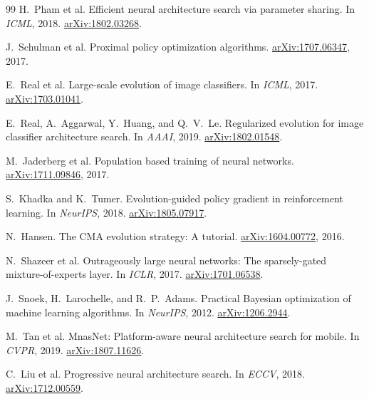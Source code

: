 \documentclass[10pt,twocolumn,letterpaper]{article}
\theoremstyle{remark}
\begin{document}
{\begin{thebibliography}{99}
H.~Pham et al.
\newblock Efficient neural architecture search via parameter sharing.
\newblock In \emph{ICML}, 2018.
\newblock \href{https://arxiv.org/abs/1802.03268}{arXiv:1802.03268}.

J.~Schulman et al.
\newblock Proximal policy optimization algorithms.
\newblock \href{https://arxiv.org/abs/1707.06347}{arXiv:1707.06347}, 2017.

E.~Real et al.
\newblock Large-scale evolution of image classifiers.
\newblock In \emph{ICML}, 2017.
\newblock \href{https://arxiv.org/abs/1703.01041}{arXiv:1703.01041}.

E.~Real, A.~Aggarwal, Y.~Huang, and Q.~V.~Le.
\newblock Regularized evolution for image classifier architecture search.
\newblock In \emph{AAAI}, 2019.
\newblock \href{https://arxiv.org/abs/1802.01548}{arXiv:1802.01548}.

M.~Jaderberg et al.
\newblock Population based training of neural networks.
\newblock \href{https://arxiv.org/abs/1711.09846}{arXiv:1711.09846}, 2017.

S.~Khadka and K.~Tumer.
\newblock Evolution-guided policy gradient in reinforcement learning.
\newblock In \emph{NeurIPS}, 2018.
\newblock \href{https://arxiv.org/abs/1805.07917}{arXiv:1805.07917}.

N.~Hansen.
\newblock The CMA evolution strategy: A tutorial.
\newblock \href{https://arxiv.org/abs/1604.00772}{arXiv:1604.00772}, 2016.

N.~Shazeer et al.
\newblock Outrageously large neural networks: The sparsely-gated mixture-of-experts layer.
\newblock In \emph{ICLR}, 2017.
\newblock \href{https://arxiv.org/abs/1701.06538}{arXiv:1701.06538}.

J.~Snoek, H.~Larochelle, and R.~P.~Adams.
\newblock Practical Bayesian optimization of machine learning algorithms.
\newblock In \emph{NeurIPS}, 2012.
\newblock \href{https://arxiv.org/abs/1206.2944}{arXiv:1206.2944}.

M.~Tan et al.
\newblock MnasNet: Platform-aware neural architecture search for mobile.
\newblock In \emph{CVPR}, 2019.
\newblock \href{https://arxiv.org/abs/1807.11626}{arXiv:1807.11626}.

C.~Liu et al.
\newblock Progressive neural architecture search.
\newblock In \emph{ECCV}, 2018.
\newblock \href{https://arxiv.org/abs/1712.00559}{arXiv:1712.00559}.


\end{thebibliography}}
\end{document}
